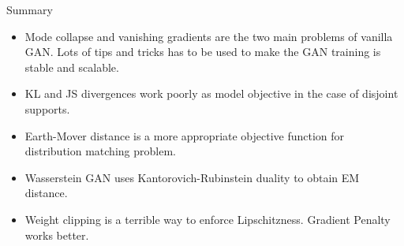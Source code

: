 \begin{frame}{Summary}
	\begin{itemize} 
		\item Mode collapse and vanishing gradients are the two main problems of vanilla GAN.  Lots of tips and tricks has to be used to make the GAN training is stable and scalable.
		\vfill
		\item KL and JS divergences work poorly as model objective in the case of disjoint supports.
		\vfill
		\item Earth-Mover distance is a more appropriate objective function for distribution matching problem.
		\vfill
		\item Wasserstein GAN uses Kantorovich-Rubinstein duality to obtain EM distance.
		\vfill
		\item Weight clipping is a terrible way to enforce Lipschitzness. Gradient Penalty works better.
	\end{itemize}
\end{frame}
 